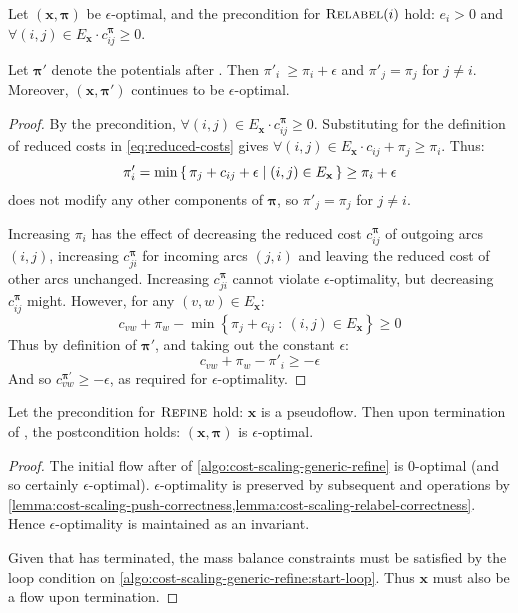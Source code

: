 \begin{lemma} \label{lemma:cost-scaling-relabel-correctness}
Let $\left(\mathbf{x},\boldsymbol{\pi}\right)$ be $\epsilon$-optimal, and the precondition for $\textproc{Relabel}(i)$ hold: $e_i > 0$ and $\forall(i,j) \in E_{\mathbf{x}} \cdot c^{\boldsymbol{\pi}}_{ij} \geq 0$.

Let $\boldsymbol{\pi}'$ denote the potentials after . Then $\pi'_i\ \geq \pi_i + \epsilon$ and $\pi'_j = \pi_j$ for $j \neq i$. Moreover, $\left(\mathbf{x},\boldsymbol{\pi}'\right)$ continues to be $\epsilon$-optimal.
\end{lemma}
\begin{proof}
By the precondition, $\forall(i,j) \in E_{\mathbf{x}} \cdot c^{\boldsymbol{\pi}}_{ij} \geq 0$. Substituting for the definition of reduced costs in \cref{eq:reduced-costs} gives $\forall(i,j) \in E_{\mathbf{x}} \cdot c_{ij} + \pi_j \geq \pi_i$. Thus:
\[\pi'_i = \min \set{\pi_j + c_{ij} + \epsilon | (i,j) \in E_{\mathbf{x}}} \geq \pi_i + \epsilon\]
 does not modify any other components of $\boldsymbol{\pi}$, so $\pi'_j = \pi_j$ for $j \neq i$.

Increasing $\pi_i$ has the effect of decreasing the reduced cost $c^{\boldsymbol{\pi}}_{ij}$ of outgoing arcs $(i,j)$, increasing $c^{\boldsymbol{\pi}}_{ji}$ for incoming arcs $(j,i)$ and leaving the reduced cost of other arcs unchanged. Increasing $c^{\boldsymbol{\pi}}_{ji}$ cannot violate $\epsilon$-optimality, but decreasing $c^{\boldsymbol{\pi}}_{ij}$ might. However, for any $(v,w) \in E_{\mathbf{x}}$:
\[c_{vw} + \pi_w - \min \left\{\pi_j + c_{ij} \::\: (i,j) \in E_{\mathbf{x}}\right\} \geq 0\]
Thus by definition of $\boldsymbol{\pi}'$, and taking out the constant $\epsilon$:
\[c_{vw} + \pi_w - \pi'_i \geq -\epsilon\]
And so $c_{vw}^{\boldsymbol{\pi}'} \geq -\epsilon$, as required for $\epsilon$-optimality.
\end{proof}

\begin{thm} \label{thm:cost-scaling-refine-correctness}
Let the precondition for $\textproc{Refine}$ hold: $\mathbf{x}$ is a pseudoflow. Then upon termination of , the postcondition holds: $\left(\mathbf{x},\boldsymbol{\pi}\right)$ is $\epsilon$-optimal.
\end{thm}
\begin{proof}
The initial flow after  of \cref{algo:cost-scaling-generic-refine} is $0$-optimal (and so certainly $\epsilon$-optimal). $\epsilon$-optimality is preserved by subsequent  and  operations by \cref{lemma:cost-scaling-push-correctness,lemma:cost-scaling-relabel-correctness}. Hence $\epsilon$-optimality is maintained as an invariant.
 
Given that  has terminated, the mass balance constraints must be satisfied by the loop condition on \cref{algo:cost-scaling-generic-refine:start-loop}. Thus $\mathbf{x}$ must also be a flow upon termination.
\end{proof}

